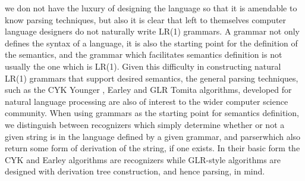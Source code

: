 \begin{isabellebody}
\begin{isamarkuptext}
we don not have the luxury of designing the language so that it is amendable to know parsing techniques, but also
it is clear that left to themselves computer language designers do not naturally write LR(1) grammars. A grammar
not only defines the syntax of a language, it is also the starting point for the definition of the semantics,
and the grammar which facilitates semantics definition is not usually the one which is LR(1). Given this difficulty
in constructing natural LR(1) grammars that support desired semantics, the general parsing techniques, such as
the CYK Younger \cite{Younger:1967}, Earley \cite{Earley:1970} and GLR Tomita \cite{Tomita:1985} algorithms, developed
for natural language processing are also of interest to the wider computer science community. When using grammars as
the starting point for semantics definition, we distinguish between recognizers which simply determine whether or not
a given string is in the language defined by a given grammar, and parserwhich also return some form of derivation
of the string, if one exists. In their basic form the CYK and Earley algorithms are recognizers while GLR-style
algorithms are designed with derivation tree construction, and hence parsing, in mind.


\end{isamarkuptext}
\end{isabellebody}
